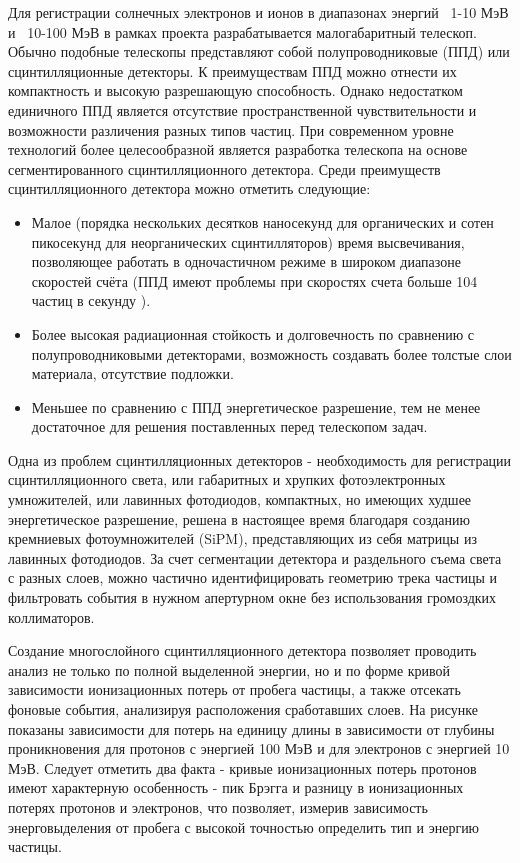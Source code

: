 Для регистрации солнечных электронов и ионов в диапазонах энергий ~1-10 МэВ и ~10-100 МэВ в рамках проекта разрабатывается малогабаритный телескоп.
Обычно подобные телескопы представляют собой полупроводниковые (ППД) или сцинтилляционные детекторы. К преимуществам ППД можно отнести их компактность и высокую разрешающую способность. Однако недостатком единичного ППД является отсутствие пространственной чувствительности и возможности различения разных типов частиц.
При современном уровне технологий более целесообразной является разработка телескопа на основе сегментированного сцинтилляционного детектора. Среди преимуществ сцинтилляционного детектора можно отметить следующие: 
\begin{itemize}
	\item Малое (порядка нескольких десятков  наносекунд для органических и сотен пикосекунд для неорганических сцинтилляторов) время высвечивания, позволяющее работать в одночастичном режиме в широком диапазоне скоростей счёта (ППД имеют проблемы при скоростях счета больше 104 частиц в секунду ).
	\item Более высокая радиационная стойкость и долговечность по сравнению с полупроводниковыми детекторами, возможность создавать более толстые слои материала, отсутствие подложки. 
	\item Меньшее по сравнению с ППД энергетическое разрешение, тем не менее достаточное для решения поставленных перед телескопом задач. 
\end{itemize}

Одна из проблем сцинтилляционных детекторов - необходимость для регистрации сцинтилляционного света, или габаритных и хрупких  фотоэлектронных умножителей, или лавинных фотодиодов, компактных, но имеющих худшее энергетическое разрешение, решена в настоящее время благодаря созданию кремниевых фотоумножителей (SiPM), представляющих из себя матрицы из лавинных фотодиодов. 
За счет сегментации детектора и раздельного съема света с разных слоев, можно частично идентифицировать геометрию трека частицы и фильтровать события в нужном апертурном окне без использования громоздких коллиматоров.

Создание многослойного сцинтилляционного детектора позволяет проводить анализ не только по полной выделенной энергии, но и по форме кривой зависимости   ионизационных потерь  от пробега частицы, а также отсекать фоновые события, анализируя расположения сработавших слоев. На рисунке показаны зависимости для потерь на единицу длины в зависимости от глубины проникновения для протонов с энергией 100 МэВ и для электронов с энергией 10 МэВ. Следует отметить два факта - кривые ионизационных потерь протонов имеют характерную особенность - пик Брэгга и разницу в ионизационных потерях протонов и электронов, что позволяет, измерив зависимость энерговыделения от пробега с высокой точностью определить тип и энергию частицы. 


